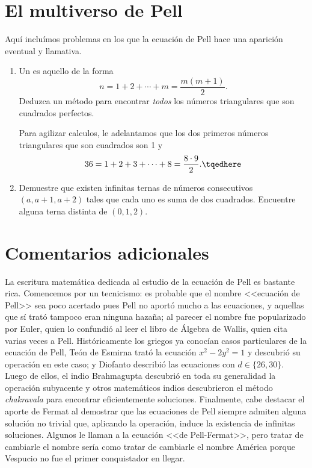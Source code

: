 \documentclass[11pt, reqno]{amsart}
\begin{document}
\section{El multiverso de Pell}
Aquí incluímos problemas en los que la ecuación de Pell hace una aparición eventual y llamativa.
\begin{enumerate}[resume]
	\item Un  es aquello de la forma
		$$ n = 1 + 2 + \cdots + m = \frac{m(m + 1)}{2}. $$
		Deduzca un método para encontrar \textit{todos} los números triangulares que son cuadrados perfectos.

		\begin{hint}
			Para agilizar calculos, le adelantamos que los dos primeros números triangulares que son cuadrados son 1 y
			\begin{equation}
				36 = 1 + 2 + 3 + \cdots + 8 = \frac{8 \cdot 9}{2}.
				\tqedhere
			\end{equation}
		\end{hint}

	\item Demuestre que existen infinitas ternas de números consecutivos $(a, a+1, a+2)$ tales que cada uno es suma de dos cuadrados.
		Encuentre alguna terna distinta de $(0, 1, 2)$.
\end{enumerate}

\section{Comentarios adicionales}
La escritura matemática dedicada al estudio de la ecuación de Pell es bastante rica.
Comencemos por un tecnicismo: es probable que el nombre <<ecuación de Pell>> sea poco acertado pues Pell no aportó mucho a las ecuaciones,
y aquellas que sí trató tampoco eran ninguna hazaña;
al parecer el nombre fue popularizado por Euler, quien lo confundió al leer el libro de Álgebra de Wallis, quien cita varias veces a Pell.
Históricamente los griegos ya conocían casos particulares de la ecuación de Pell, Teón de Esmirna trató la ecuación $x^2 - 2y^2 = 1$ y
descubrió su operación en este caso; y Diofanto describió las ecuaciones con $d \in \{ 26, 30 \}$.
Luego de ellos, el indio Brahmagupta descubrió en toda su generalidad la operación subyacente y otros matemáticos indios descubrieron el método
\textit{chakravala} para encontrar eficientemente soluciones.
Finalmente, cabe destacar el aporte de Fermat al demostrar que las ecuaciones de Pell siempre admiten alguna solución no trivial que,
aplicando la operación, induce la existencia de infinitas soluciones.
Algunos le llaman a la ecuación <<de Pell-Fermat>>, pero tratar de cambiarle el nombre sería como tratar de cambiarle el nombre América porque Vespucio
no fue el primer conquistador en llegar.
\end{document}
